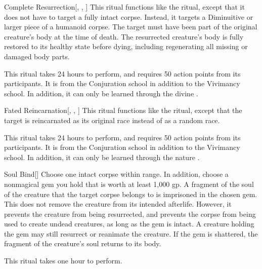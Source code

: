 \lowercase{\hypertarget{spell:Complete Resurrection}{}}\label{spell:Complete Resurrection}
\begin{apability}[\nth{5}]{\hypertarget{spell:Complete Resurrection}{Complete Resurrection}}[, , ]
This ritual functions like the  ritual, except that it does not have to target a fully intact corpse.
Instead, it targets a Diminuitive or larger piece of a humanoid corpse.
The target must have been part of the original creature's body at the time of death.
The resurrected creature's body is fully restored to its healthy state before dying, including regenerating all missing or damaged body parts.

This ritual takes 24 hours to perform, and requires 50 action points from its participants.
It is from the Conjuration school in addition to the Vivimancy school.
In addition, it can only be learned through the divine .
\end{apability}
\vspace{0.25em}



\lowercase{\hypertarget{spell:Fated Reincarnation}{}}\label{spell:Fated Reincarnation}
\begin{apability}[\nth{5}]{\hypertarget{spell:Fated Reincarnation}{Fated Reincarnation}}[, , ]
This ritual functions like the  ritual, except that the target is reincarnated as its original race instead of as a random race.

This ritual takes 24 hours to perform, and requires 50 action points from its participants.
It is from the Conjuration school in addition to the Vivimancy school.
In addition, it can only be learned through the nature .
\end{apability}
\vspace{0.25em}



\lowercase{\hypertarget{spell:Soul Bind}{}}\label{spell:Soul Bind}
\begin{apability}[\nth{5}]{\hypertarget{spell:Soul Bind}{Soul Bind}}[]
Choose one intact corpse within \rngclose range.
In addition, choose a nonmagical gem you hold that is worth at least 1,000 gp.
A fragment of the soul of the creature that the target corpse belongs to is imprisoned in the chosen gem.
This does not remove the creature from its intended afterlife.
However, it prevents the creature from being resurrected, and prevents the corpse from being used to create undead creatures, as long as the gem is intact.
A creature holding the gem may still resurrect or reanimate the creature.
If the gem is shattered, the fragment of the creature's soul returns to its body.

This ritual takes one hour to perform.
\end{apability}
\vspace{0.25em}



